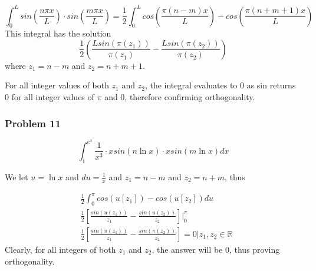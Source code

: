 \documentclass{article}
\begin{document}
$$\int_0^{L} sin\left(\frac{n \pi x}{L}\right) \cdot sin\left(\frac{m \pi x}{L}\right) = \frac{1}{2} \int_0^{L} cos \left(\frac{\pi\left(n-m\right)x}{L}\right) - cos\left(\frac{\pi\left(n+m+1\right)x}{L}\right)$$
This integral has the solution
$$\frac{1}{2} \left( \frac{L sin(\pi(z_1))}{\pi(z_1)} - \frac{L sin(\pi(z_2))}{\pi(z_2)}\right)$$
where $z_1 = n-m$ and $z_2 = n+m+1$.

For all integer values of both $z_1$ and $z_2$, the integral evaluates to 0 as sin returns 0 for all integer values of $\pi$ and 0, therefore confirming orthogonality.

\subsubsection*{Problem 11}


$$\int_1^{e^\pi} \frac{1}{x^3} \cdot xsin\left(n \ln x\right) \cdot xsin\left(m \ln x\right) dx$$

We let $u = \ln x$ and $du = \frac{1}{x}$ and $z_1 = n-m$ and $z_2 = n+m$, thus

\begin{align*}
&\frac{1}{2} \int_0^{\pi} cos\left(u\left[z_1\right]\right)-cos\left(u\left[z_2\right]\right) du \\
&\frac{1}{2} \left[ \frac{sin\left(u\left(z_1\right)\right)}{z_1}-\frac{sin\left(u\left(z_2\right)\right)}{z_2}\right]\Bigr|_0^{\pi} \\
&\frac{1}{2} \left[ \frac{sin\left(\pi\left(z_1\right)\right)}{z_1} - \frac{sin\left(\pi\left(z_2\right)\right)}{z_2}\right] = 0 \Bigr| z_1, z_2 \in\mathbb{R}
\end{align*}
Clearly, for all integers of both $z_1$ and $z_2$, the answer will be 0, thus proving orthogonality.
\end{document}
